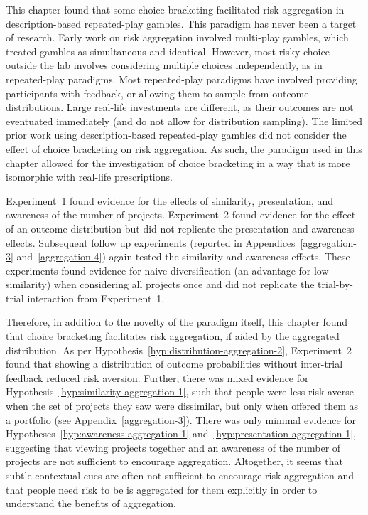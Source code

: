 \documentclass[a4paper, nobind, dvipsnames]{templates/ociamthesis}
\theoremstyle{definition}
\theoremstyle{definition}
\theoremstyle{definition}
\theoremstyle{definition}
\theoremstyle{remark}
\begin{document}
This chapter found that some choice bracketing facilitated risk aggregation in
description-based repeated-play gambles. This paradigm has never been a target
of research. Early work on risk aggregation involved multi-play gambles, which
treated gambles as simultaneous and identical. However, most risky choice
outside the lab involves considering multiple choices independently, as in
repeated-play paradigms. Most repeated-play paradigms have involved providing
participants with feedback, or allowing them to sample from outcome
distributions. Large real-life investments are different, as their outcomes are
not eventuated immediately (and do not allow for distribution sampling). The
limited prior work using description-based repeated-play gambles did not
consider the effect of choice bracketing on risk aggregation. As such, the
paradigm used in this chapter allowed for the investigation of choice bracketing
in a way that is more isomorphic with real-life prescriptions.

Experiment~1 found evidence for the effects of similarity, presentation, and
awareness of the number of projects. Experiment~2 found evidence for the effect
of an outcome distribution but did not replicate the presentation and awareness
effects. Subsequent follow up experiments (reported in
Appendices~\ref{aggregation-3} and~\ref{aggregation-4}) again tested the
similarity and awareness effects. These experiments found evidence for naive
diversification (an advantage for low similarity) when considering all projects
once and did not replicate the trial-by-trial interaction from Experiment~1.

Therefore, in addition to the novelty of the paradigm itself, this chapter found
that choice bracketing facilitates risk aggregation, if aided by the aggregated
distribution. As per Hypothesis~\ref{hyp:distribution-aggregation-2},
Experiment~2 found that showing a distribution of outcome probabilities without
inter-trial feedback reduced risk aversion. Further, there was mixed evidence
for Hypothesis~\ref{hyp:similarity-aggregation-1}, such that people were less
risk averse when the set of projects they saw were dissimilar, but only when
offered them as a portfolio (see Appendix~\ref{aggregation-3}). There was only
minimal evidence for Hypotheses~\ref{hyp:awareness-aggregation-1}
and~\ref{hyp:presentation-aggregation-1}, suggesting that viewing projects
together and an awareness of the number of projects are not sufficient to
encourage aggregation. Altogether, it seems that subtle contextual cues are
often not sufficient to encourage risk aggregation and that people need risk to
be is aggregated for them explicitly in order to understand the benefits of
aggregation.
\end{document}
